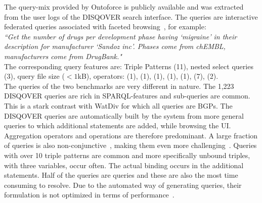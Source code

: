 %


The query-mix provided by Ontoforce is publicly available 
and was extracted from the user logs of the DISQOVER search interface. 
The queries are interactive federated queries associated with faceted browsing~\cite{Ferre, Oren}, for example:\\

\textit{``Get the number of drugs per development phase having `migraine'
in their description for manufacturer `Sandoz inc'. Phases come
from chEMBL, \\ manufacturers come from DrugBank."} \\

The corresponding query features are: Triple Patterns (11), nested select queries (3), query file size ($<1$kB), operators:  (1), (1), (1), (1), (1), (7), (2).  \\


The queries of the two benchmarks are very different in nature. 
The 1,223 DISQOVER queries are rich in SPARQL-features and sub-queries are common. This is a stark contrast with WatDiv for which all queries are BGPs.
The DISQOVER queries are automatically built by the system from more general queries to which additional  statements are added, while browsing the UI.
Aggregation operators and  operations are therefore predominant. A large fraction of queries is also non-conjunctive~\cite{conjunctive}, making them even more challenging~\cite{Picalausa2011}.
Queries with over 10 triple patterns are common and more specifically unbound triples, with three variables, occur often. The actual binding occurs in the additional  statements. Half of the queries are  queries and these are also the most time consuming to resolve. 
Due to the automated way of generating queries, their formulation is not optimized in terms of performance~\cite{Groth}. 
